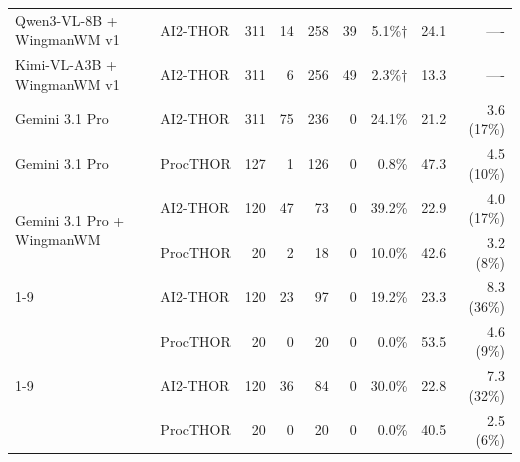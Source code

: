 \documentclass[10pt]{ctexart}
\begin{document}
\begin{table}[t]
\begin{tabular}{llrrrrrrr}
    Qwen3-VL-8B + WingmanWM v1 & AI2-THOR & 311 & 14 & 258 & 39 & 5.1\%$\dagger$ & 24.1 & ---- \\
    Kimi-VL-A3B + WingmanWM v1 & AI2-THOR & 311 & 6 & 256 & 49 & 2.3\%$\dagger$ & 13.3 & ---- \\
    Gemini 3.1 Pro & AI2-THOR & 311 & 75 & 236 & 0 & 24.1\% & 21.2 & 3.6 (17\%) \\
    Gemini 3.1 Pro & ProcTHOR & 127 & 1 & 126 & 0 & 0.8\% & 47.3 & 4.5 (10\%) \\
    \multirow{2}{*}{Gemini 3.1 Pro + WingmanWM} & AI2-THOR & 120 & 47 & 73 & 0 & 39.2\% & 22.9 & 4.0 (17\%) \\
     & ProcTHOR & 20 & 2 & 18 & 0 & 10.0\% & 42.6 & 3.2 (8\%) \\
    \cmidrule(l){1-9}
    \multirow{2}{*}{GPT-5} & AI2-THOR & 120 & 23 & 97 & 0 & 19.2\% & 23.3 & 8.3 (36\%) \\
     & ProcTHOR & 20 & 0 & 20 & 0 & 0.0\% & 53.5 & 4.6 (9\%) \\
    \cmidrule(l){1-9}
    \multirow{2}{*}{GPT-5 + WingmanWM} & AI2-THOR & 120 & 36 & 84 & 0 & 30.0\% & 22.8 & 7.3 (32\%) \\
     & ProcTHOR & 20 & 0 & 20 & 0 & 0.0\% & 40.5 & 2.5 (6\%) \\
    \bottomrule
  \end{tabular}
\end{table}
\end{document}
